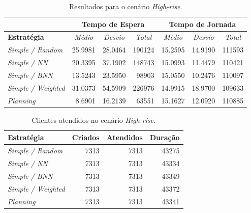 \begin{table}[htb!]
\centering
\caption{Resultados para o cenário \textit{High-rise}.}
\label{tab:results:highrise}
\begin{tabular}{|l|r|r|r|r|r|r|}
\hline
\multicolumn{1}{|c|}{\textbf{}}                 & \multicolumn{3}{c|}{\textbf{Tempo de Espera}}                                                                    & \multicolumn{3}{c|}{\textbf{Tempo de Jornada}}                                                                                                                       \\ \hline
\textbf{Estratégia} & \multicolumn{1}{c|}{\textit{Médio}} & \multicolumn{1}{c|}{\textit{Desvio}} & \multicolumn{1}{c|}{\textit{Total}} & \multicolumn{1}{c|}{\textit{Médio}}                   & \multicolumn{1}{c|}{\textit{Desvio}}                  & \multicolumn{1}{c|}{\textit{Total}}                  \\ \hline
\textit{Simple / Random}          & 25.9981 & 28.0464 & 190124 & 15.2595 & 14.9190 & 111593 \\ \hline
\textit{Simple / NN}              & 20.3395 & 37.1902 & 148743 & 15.0993 & 11.4479 & 110421 \\ \hline
\textit{Simple / BNN}             & 13.5243 & 23.5950 &  98903 & 15.0550 & \cellcolor[HTML]{67FD9A}10.2476 & 110097 \\ \hline
\textit{Simple / Weighted}        & 31.0373 & 54.5909 & 226976 & \cellcolor[HTML]{67FD9A}14.9915 & 18.9700 & \cellcolor[HTML]{67FD9A}109633 \\ \hline
\textit{Planning}                 &  \cellcolor[HTML]{67FD9A}8.6901 & \cellcolor[HTML]{67FD9A}16.2139 &  \cellcolor[HTML]{67FD9A}63551 & 15.1627 & 12.0920 & 110885 \\ \hline
\end{tabular}
\end{table}

\begin{table}[htb]
\centering
\caption{Clientes atendidos no cenário \textit{High-rise}.}
\label{table:results:highrise:clients}
\begin{tabular}{|l|r|r|r|}
\hline
\textbf{Estratégia}        & \multicolumn{1}{l|}{\textbf{Criados}} & \multicolumn{1}{l|}{\textbf{Atendidos}} & \multicolumn{1}{l|}{\textbf{Duração}} \\ \hline
\textit{Simple / Random}   & 7313 & 7313 & 43275 \\ \hline
\textit{Simple / NN}       & 7313 & 7313 & 43334 \\ \hline
\textit{Simple / BNN}      & 7313 & 7313 & 43349 \\ \hline
\textit{Simple / Weighted} & 7313 & 7313 & 43372 \\ \hline
\textit{Planning}          & 7313 & 7313 & 43341 \\ \hline
\end{tabular}
\end{table}

